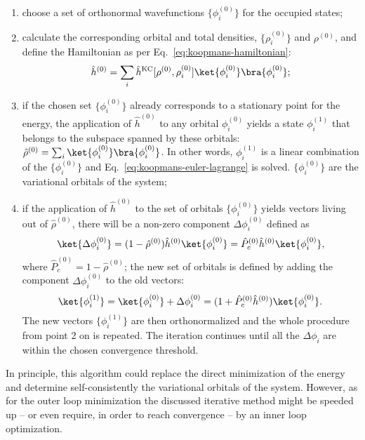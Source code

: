 \begin{enumerate}
    \item choose a set of orthonormal wavefunctions $\{ \phi_i^{(0)} \}$ for the occupied states;
    \item calculate the corresponding orbital and total densities, $\{ \rho_i^{(0)} \}$ and $\rho^{(0)}$, and define the Hamiltonian as per Eq.~\eqref{eq:koopmans-hamiltonian}:
    \begin{equation}
        \hat{h}^{(0)} = \sum_i \hat{h}^{\rm KC}[\rho^{(0)},\rho_i^{(0)}] \ket{\phi_i^{(0)}} \bra{\phi_i^{(0)}} ;
    \end{equation}
    \item if the chosen set $\{ \phi_i^{(0)} \}$ already corresponds to a stationary point for the energy, the application of $\hat{h}^{(0)}$ to any orbital $\phi_i^{(0)}$ yields a state $\phi_i^{(1)}$ that belongs to the subspace spanned by these orbitals: $\hat{\rho}^{(0)} = \sum_i \ket{\phi_i^{(0)}} \bra{\phi_i^{(0)}}$. In other words, $\phi_i^{(1)}$ is a linear combination of the $\{ \phi_i^{(0)} \}$ and Eq.~\eqref{eq:koopmans-euler-lagrange} is solved. $\{ \phi_i^{(0)} \}$ are the variational orbitals of the system;
    \item if the application of $\hat{h}^{(0)}$ to the set of orbitals $\{ \phi_i^{(0)} \}$ yields vectors living out of $\hat{\rho}^{(0)}$, there will be a non-zero component $\Delta \phi_i^{(0)}$ defined as
    \begin{equation}
        \ket{\Delta \phi_i^{(0)}} = (1 - \hat{\rho}^{(0)}) \hat{h}^{(0)} \ket{\phi_i^{(0)}} = \hat{P}^{(0)}_c \hat{h}^{(0)} \ket{\phi_i^{(0)}} ,
        \label{eq:vec-comp-out}
    \end{equation}
    where $\hat{P}^{(0)}_c = 1 - \hat{\rho}^{(0)}$; the new set of orbitals is defined by adding the component $\Delta \phi_i^{(0)}$ to the old vectors:
    \begin{equation}
        \ket{\phi_i^{(1)}} = \ket{\phi_i^{(0)}} + \Delta \phi_i^{(0)} = (1 + \hat{P}^{(0)}_c \hat{h}^{(0)}) \ket{\phi_i^{(0)}} .
        \label{eq:updated-vector}
    \end{equation}
    The new vectors $\{ \phi_i^{(1)} \}$ are then orthonormalized and the whole procedure from point 2 on is repeated. The iteration continues until all the $\Delta \phi_i$ are within the chosen convergence threshold.
\end{enumerate}

In principle, this algorithm could replace the direct minimization of the energy and determine self-consistently the variational orbitals of the system. However, as for the outer loop minimization the discussed iterative method might be speeded up -- or even require, in order to reach convergence -- by an inner loop optimization.